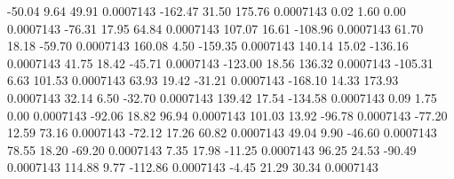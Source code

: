       -50.04        9.64       49.91     0.0007143
     -162.47       31.50      175.76     0.0007143
        0.02        1.60        0.00     0.0007143
      -76.31       17.95       64.84     0.0007143
      107.07       16.61     -108.96     0.0007143
       61.70       18.18      -59.70     0.0007143
      160.08        4.50     -159.35     0.0007143
      140.14       15.02     -136.16     0.0007143
       41.75       18.42      -45.71     0.0007143
     -123.00       18.56      136.32     0.0007143
     -105.31        6.63      101.53     0.0007143
       63.93       19.42      -31.21     0.0007143
     -168.10       14.33      173.93     0.0007143
       32.14        6.50      -32.70     0.0007143
      139.42       17.54     -134.58     0.0007143
        0.09        1.75        0.00     0.0007143
      -92.06       18.82       96.94     0.0007143
      101.03       13.92      -96.78     0.0007143
      -77.20       12.59       73.16     0.0007143
      -72.12       17.26       60.82     0.0007143
       49.04        9.90      -46.60     0.0007143
       78.55       18.20      -69.20     0.0007143
        7.35       17.98      -11.25     0.0007143
       96.25       24.53      -90.49     0.0007143
      114.88        9.77     -112.86     0.0007143
       -4.45       21.29       30.34     0.0007143
